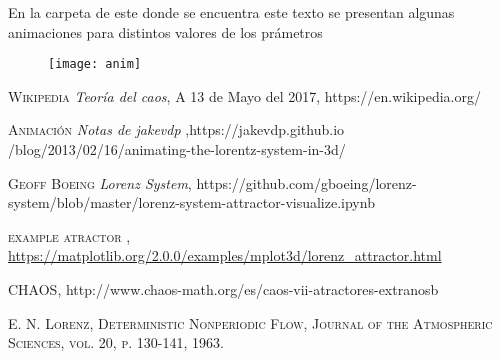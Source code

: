 \documentclass[12pt]{article}
\begin{document}
En la carpeta de este donde se encuentra este texto se presentan algunas animaciones para distintos valores de los prámetros

\begin{figure}[ht]
\texttt{[image: anim]}
\centering
\end{figure}

\newpage 
\renewcommand{\refname}{\section*{Bibliografía}}
\begin{thebibliography}{9}




 \textsc{Wikipedia}
\textit{Teoría del caos}, A 13 de Mayo del 2017, https://en.wikipedia.org/

 \textsc{Animación}
\textit{Notas de jakevdp} ,https://jakevdp.github.io
/blog/2013/02/16/animating-the-lorentz-system-in-3d/

 \textsc{Geoff Boeing}
\textit{Lorenz System}, 
https://github.com/gboeing/lorenz-system/blob/master/lorenz-system-attractor-visualize.ipynb

 \textsc{example atractor}
\textit{}, \url{https://matplotlib.org/2.0.0/examples/mplot3d/lorenz_attractor.html}

 \textsc{CHAOS}, 
http://www.chaos-math.org/es/caos-vii-atractores-extranosb


 \textsc{E. N. Lorenz, Deterministic Nonperiodic Flow, Journal of the Atmospheric Sciences, vol. 20, p. 130-141, 1963.} 




\end{thebibliography}


\end{document}
